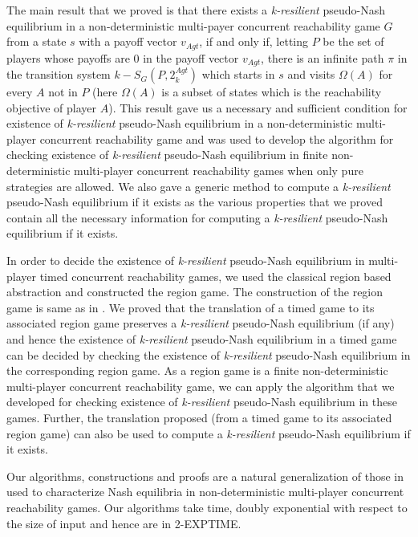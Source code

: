 The main result that we proved is that there exists a \textit{k-resilient} pseudo-Nash equilibrium in a non-deterministic multi-payer concurrent reachability game $G$ from a state $s$ with a payoff vector $v_{Agt}$, if and only if, letting $P$ be the set of players whose payoffs are $0$ in the payoff vector $v_{Agt}$, there is an infinite path $\pi$ in the transition system $k-S_{G}(P, 2^{Agt}_{k})$ which starts in $s$ and visits $\Omega(A)$ for every $A$ not in $P$ (here $\Omega(A)$ is a subset of states which is the reachability objective of player $A$). This result gave us a necessary and sufficient condition for existence of \textit{k-resilient} pseudo-Nash equilibrium in a non-deterministic multi-player concurrent reachability game and was used to develop the algorithm for checking existence of \textit{k-resilient} pseudo-Nash equilibrium in finite non-deterministic multi-player concurrent reachability games when only pure strategies are allowed. We also gave a generic method to compute a \textit{k-resilient} pseudo-Nash equilibrium if it exists as the various properties that we proved contain all the necessary information for computing a \textit{k-resilient} pseudo-Nash equilibrium if it exists.

In order to decide the existence of \textit{k-resilient} pseudo-Nash equilibrium in multi-player timed concurrent reachability games, we used the classical region based abstraction and constructed the region game. The construction of the region game is same as in \cite{BBM-concur10,BBM-report}. We proved that the translation of a timed game to its associated region game preserves a \textit{k-resilient} pseudo-Nash equilibrium (if any) and hence the existence of \textit{k-resilient} pseudo-Nash equilibrium in a timed game can be decided by checking the existence of \textit{k-resilient} pseudo-Nash equilibrium in the corresponding region game. As a region game is a finite non-deterministic multi-player concurrent reachability game, we can apply the algorithm that we developed for checking existence of \textit{k-resilient} pseudo-Nash equilibrium in these games. Further, the translation proposed (from a timed game to its associated region game) can also be used to compute a \textit{k-resilient} pseudo-Nash equilibrium if it exists.

Our algorithms, constructions and proofs are a natural generalization of those in \cite{BBM-concur10,BBM-report} used to characterize Nash equilibria in non-deterministic multi-player concurrent reachability games. Our algorithms take time, doubly exponential with respect to the size of input and hence are in 2-EXPTIME.


